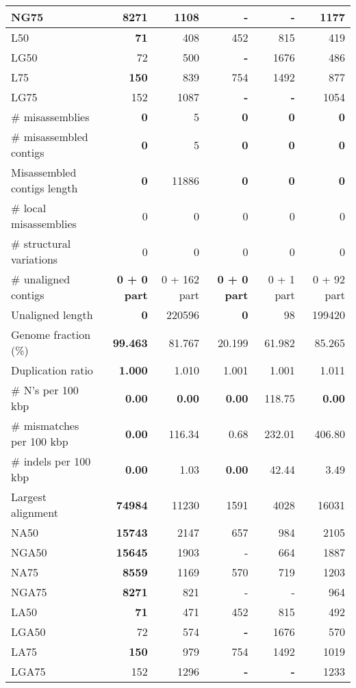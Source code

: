 \documentclass[12pt,a4paper]{article}
\begin{document}
\begin{table}[ht]
\begin{center}
\begin{tabular}{|l*{5}{|r}|}
NG75 & {\bf 8271} & 1108 & - & - & 1177 \\ \hline
L50 & {\bf 71} & 408 & 452 & 815 & 419 \\ \hline
LG50 & 72 & 500 & {\bf -} & 1676 & 486 \\ \hline
L75 & {\bf 150} & 839 & 754 & 1492 & 877 \\ \hline
LG75 & 152 & 1087 & {\bf -} & {\bf -} & 1054 \\ \hline
\# misassemblies & {\bf 0} & 5 & {\bf 0} & {\bf 0} & {\bf 0} \\ \hline
\# misassembled contigs & {\bf 0} & 5 & {\bf 0} & {\bf 0} & {\bf 0} \\ \hline
Misassembled contigs length & {\bf 0} & 11886 & {\bf 0} & {\bf 0} & {\bf 0} \\ \hline
\# local misassemblies & 0 & 0 & 0 & 0 & 0 \\ \hline
\# structural variations & 0 & 0 & 0 & 0 & 0 \\ \hline
\# unaligned contigs & {\bf 0 + 0 part} & 0 + 162 part & {\bf 0 + 0 part} & 0 + 1 part & 0 + 92 part \\ \hline
Unaligned length & {\bf 0} & 220596 & {\bf 0} & 98 & 199420 \\ \hline
Genome fraction (\%) & {\bf 99.463} & 81.767 & 20.199 & 61.982 & 85.265 \\ \hline
Duplication ratio & {\bf 1.000} & 1.010 & 1.001 & 1.001 & 1.011 \\ \hline
\# N's per 100 kbp & {\bf 0.00} & {\bf 0.00} & {\bf 0.00} & 118.75 & {\bf 0.00} \\ \hline
\# mismatches per 100 kbp & {\bf 0.00} & 116.34 & 0.68 & 232.01 & 406.80 \\ \hline
\# indels per 100 kbp & {\bf 0.00} & 1.03 & {\bf 0.00} & 42.44 & 3.49 \\ \hline
Largest alignment & {\bf 74984} & 11230 & 1591 & 4028 & 16031 \\ \hline
NA50 & {\bf 15743} & 2147 & 657 & 984 & 2105 \\ \hline
NGA50 & {\bf 15645} & 1903 & - & 664 & 1887 \\ \hline
NA75 & {\bf 8559} & 1169 & 570 & 719 & 1203 \\ \hline
NGA75 & {\bf 8271} & 821 & - & - & 964 \\ \hline
LA50 & {\bf 71} & 471 & 452 & 815 & 492 \\ \hline
LGA50 & 72 & 574 & {\bf -} & 1676 & 570 \\ \hline
LA75 & {\bf 150} & 979 & 754 & 1492 & 1019 \\ \hline
LGA75 & 152 & 1296 & {\bf -} & {\bf -} & 1233 \\ \hline
\end{tabular}
\end{center}
\end{table}
\end{document}
